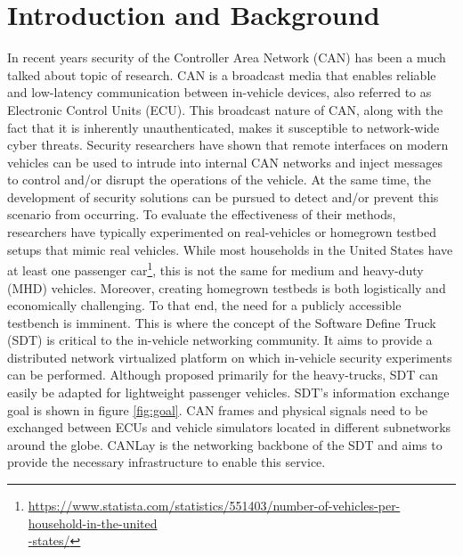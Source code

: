 \documentclass[letterpaper,twocolumn,10pt]{article}
\begin{document}
\section{Introduction and Background}
In recent years security of the Controller Area Network (CAN) has been a much talked about topic of research. CAN is a broadcast media that enables reliable and low-latency communication between in-vehicle devices, also referred to as Electronic Control Units (ECU). This broadcast nature of CAN, along with the fact that it is inherently unauthenticated, makes it susceptible to network-wide cyber threats. 
Security researchers have shown \cite{checkoway_comprehensive_2011, mukherjee_practical_2016,burakova_truck_2016} that remote interfaces on modern vehicles can be used to intrude into internal CAN networks and inject messages to control and/or disrupt the operations of the vehicle. At the same time, the development of security solutions can be pursued to detect and/or prevent this scenario from occurring.
To evaluate the effectiveness of their methods, researchers have typically experimented on real-vehicles or homegrown testbed setups that mimic real vehicles. 
While most households in the United States have at least one passenger car\footnote{\url{https://www.statista.com/statistics/551403/number-of-vehicles-per-household-in-the-united}\\\url{-states/}}, this is not the same for medium and heavy-duty (MHD) vehicles. 
Moreover, creating homegrown testbeds is both logistically and economically challenging. To that end, the need for a publicly accessible testbench is imminent. This is where the concept of the Software Define Truck (SDT) \cite{mukherjee_towards_2021} is critical to the in-vehicle networking community. It aims to provide a distributed network virtualized platform on which in-vehicle security experiments can be performed. Although proposed primarily for the heavy-trucks, SDT can easily be adapted for lightweight passenger vehicles. SDT's information exchange goal is shown in figure \ref{fig:goal}. CAN frames and physical signals need to be exchanged between ECUs and vehicle simulators located in different subnetworks around the globe. CANLay is the networking backbone of the SDT and aims to provide the necessary infrastructure to enable this service.
\end{document}
